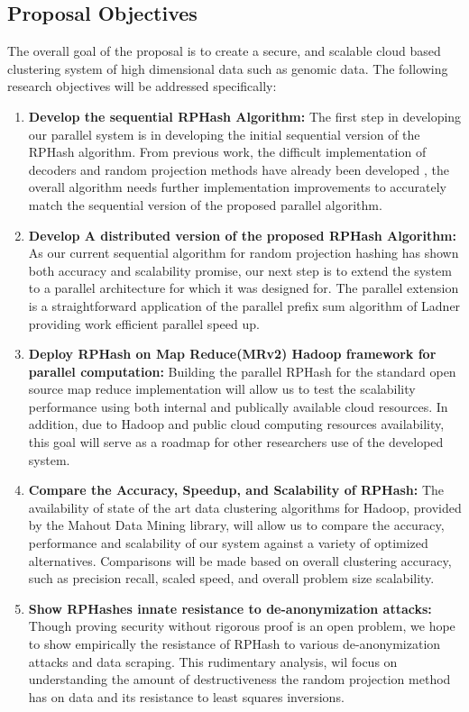 \documentclass[a4paper,10pt]{article}
\begin{document}
\subsection{Proposal Objectives}
The overall goal of the proposal is to create a secure, and scalable cloud based 
clustering system of high dimensional data such as genomic data. The following research
objectives will be addressed specifically:
\begin{enumerate}
\item \textbf{Develop the sequential RPHash Algorithm:}
 The first step in developing our parallel system is in developing the initial
 sequential version of the RPHash algorithm. From previous work, the difficult
 implementation of decoders and random projection methods have already been developed\cite{carraher}
 , the overall algorithm needs further implementation improvements to
 accurately match the sequential version of the proposed parallel algorithm.

  \item \textbf{Develop A distributed version of the proposed RPHash Algorithm:}
  As our current sequential algorithm for random projection hashing has shown both 
 accuracy and scalability promise, our next step is to extend the system to a parallel
architecture for which it was designed for. The parallel extension is a straightforward
application of the parallel prefix sum algorithm of Ladner\cite{Ladner} providing work
efficient parallel speed up.


  \item \textbf{ Deploy RPHash on Map Reduce(MRv2) Hadoop framework for parallel computation:}
Building the parallel RPHash for the standard open source map reduce implementation will allow us
to test the scalability performance using both internal and publically available cloud resources. In addition,
due to Hadoop and public cloud computing resources availability, this goal will serve as a roadmap for
other researchers use of the developed system.

  \item \textbf{Compare the Accuracy, Speedup, and Scalability of RPHash:} The availability of
  state of the art data clustering algorithms for Hadoop, provided by the Mahout Data Mining library,
 will allow us to compare the accuracy, performance and scalability of our system against a variety
 of optimized alternatives. Comparisons will be made based on overall clustering accuracy, such as
precision recall, scaled speed, and overall problem size scalability.
 \item \textbf{Show RPHashes innate resistance to de-anonymization attacks:} Though proving security
without rigorous proof is an open problem, we hope to show empirically the resistance of RPHash to
various de-anonymization attacks and data scraping. This rudimentary analysis, wil focus on
understanding the amount of destructiveness the random projection method has on data and its resistance
to least squares inversions.
\end{enumerate}
\end{document}
